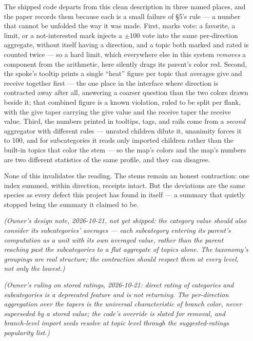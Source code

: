 The shipped code departs from this clean description in three named
places, and the paper records them because each is a small failure of
\S 5's rule --- a number that cannot be unfolded the way it was made.
First, marks vote: a favorite, a limit, or a not-interested mark injects
a $\pm$100 vote into the same per-direction aggregate, without itself having
a direction, and a topic both marked and rated is counted twice --- so a
hard limit, which everywhere else in this system \emph{removes} a
component from the arithmetic, here silently drags its parent's color
red. Second, the spoke's tooltip prints a single ``heat'' figure per
topic that averages give and receive together first --- the one place in
the interface where direction is contracted away after all, answering a
coarser question than the two colors drawn beside it; that combined
figure is a known violation, ruled to be split per flank, with the give
taper carrying the give value and the receive taper the receive value.
Third, the numbers printed in tooltips, tags, and rails come from a
\emph{second} aggregator with different rules --- unrated children
dilute it, unanimity forces it to 100, and for subcategories it reads
only imported children rather than the built-in topics that color the
stem --- so the map's colors and the map's numbers are two different
statistics of the same profile, and they can disagree.

None of this invalidates the reading. The stems remain an honest
contraction: one index summed, within direction, receipts intact. But
the deviations are the same species as every defect this project has
found in itself --- a summary that quietly stopped being the summary it
claimed to be.

\emph{(Owner's design note, 2026-10-21, not yet shipped: the category
value should also consider its subcategories' averages --- each
subcategory entering its parent's computation as a unit with its own
averaged value, rather than the parent reaching past the subcategories
to a flat aggregate of topics alone. The taxonomy's groupings are real
structure; the contraction should respect them at every level, not only
the lowest.)}

\emph{(Owner's ruling on stored ratings, 2026-10-21: direct rating of
categories and subcategories is a deprecated feature and is not
returning. The per-direction aggregation over the tapers is the
universal characteristic of branch color, never superseded by a stored
value; the code's override is slated for removal, and branch-level
import seeds resolve at topic level through the suggested-ratings
popularity list.)}

